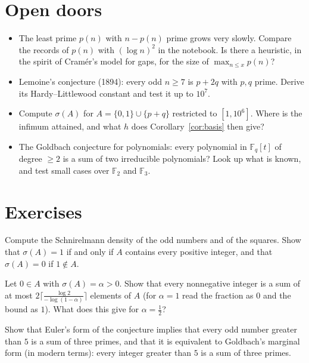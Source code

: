 \section{Open doors}

\begin{itemize}
\item The least prime $p(n)$ with $n-p(n)$ prime grows very slowly. Compare the records of $p(n)$ with $(\log n)^2$ in the notebook. Is there a heuristic,
in the spirit of Cram\'er's model for gaps, for the size of $\max_{n\le x}p(n)$?
\item Lemoine's conjecture (1894): every odd $n\ge7$ is $p+2q$ with $p,q$ prime. Derive its Hardy--Littlewood constant and test it up to $10^7$.
\item Compute $\sigma(A)$ for $A=\{0,1\}\cup\{p+q\}$ restricted to $[1,10^6]$. Where is the infimum attained, and what $h$ does Corollary~\ref{cor:basis}
then give?
\item The Goldbach conjecture for polynomials: every polynomial in $\mathbb F_q[t]$ of degree $\ge2$ is a sum of two irreducible polynomials? Look up
what is known, and test small cases over $\mathbb F_2$ and $\mathbb F_3$.
\end{itemize}

\section{Exercises}

\begin{exercise}[$\star$]\label{ex:sdensity}
Compute the Schnirelmann density of the odd numbers and of the squares. Show that $\sigma(A)=1$ if and only if $A$ contains every positive integer, and
that $\sigma(A)=0$ if $1\notin A$.
\end{exercise}

\begin{exercise}[$\star\star$]\label{ex:basisorder}
Let $0\in A$ with $\sigma(A)=\alpha>0$. Show that every nonnegative integer is a sum of at most $2\bigl\lceil\frac{\log2}{-\log(1-\alpha)}\bigr\rceil$ elements
of $A$ (for $\alpha=1$ read the fraction as $0$ and the bound as $1$). What does this give for $\alpha=\frac12$?
\end{exercise}

\begin{exercise}[$\star$]\label{ex:goldbachforms}
Show that Euler's form of the conjecture implies that every odd number greater than $5$ is a sum of three primes, and that it is equivalent to
Goldbach's marginal form (in modern terms): every integer greater than $5$ is a sum of three primes.
\end{exercise}

